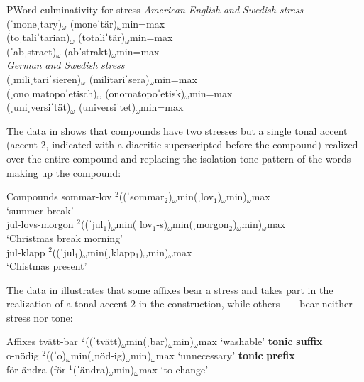 \documentclass[output=paper]{langscibook}
\begin{document}
\ea  PWord culminativity for stress \label{ex:downing:13}
\ea  \textit{American} \textit{English} \textit{and} \textit{Swedish} \textit{stress}\\
\ex  (ˈmoneˌtary)$_ω$  (moneˈtär)$_ω$min=max\\
\ex  (toˌtaliˈtarian)$_ω$  (totaliˈtär)$_ω$min=max\\
\ex  (ˈabˌstract)$_ω$  (abˈstrakt)$_ω$min=max\\
\ex  \textit{German} \textit{and} \textit{Swedish} \textit{stress}\\
\ex  (ˌmiliˌtariˈsieren)$_ω$  (militariˈsera)$_ω$min=max\\
\ex  (ˌonoˌmatopoˈetisch)$_ω$  (onomatopoˈetisk)$_ω$min=max\\
\ex  (ˌuniˌversiˈtät)$_ω$  (universiˈtet)$_ω$min=max\\
\z
\z

The data in  shows that compounds have two stresses but a single tonal accent (accent 2, indicated with a diacritic superscripted before the compound) realized over the entire compound and replacing the isolation tone pattern of the words making up the compound:


\ea  Compounds \label{ex:downing:14}
\ea  sommar-lov   $^2$((ˈsommar$_2$)$_ω$min(ˌlov$_1$)$_ω$min)$_ω$max \\
     ‘summer break’\\
\ex   jul-lovs-morgon  $^2$((ˈjul$_1$)$_ω$min(ˌlov$_1${}-s)$_ω$min(ˌmorgon$_2$)$_ω$min)$_ω$max \\
    ‘Christmas break morning’\\
\ex   jul-klapp   $^2$((ˈjul$_1$)$_ω$min(ˌklapp$_1$)$_ω$min)$_ω$max \\
     ‘Chistmas present’\\
\z
\z

The data in  illustrates that some affixes bear a stress and takes part in the realization of a tonal accent 2 in the construction, while others –   – bear neither stress nor tone:


\ea  Affixes \label{ex:downing:15}
\ea  tvätt-bar  $^2$((ˈtvätt)$_ω$min(ˌbar)$_ω$min)$_ω$max   ‘washable’ \textbf{tonic} \textbf{suffix} \label{ex:downing:15a}\\
\ex   o-nödig  $^2$((ˈo)$_ω$min(ˌnöd-ig)$_ω$min)$_ω$max   ‘unnecessary’ \textbf{tonic} \textbf{prefix}\label{ex:downing:15b}\\
\ex   för-ändra  (för-$^1$(ˈändra)$_ω$min)$_ω$max   ‘to change’\label{ex:downing:15c}\\
\z
\z
\end{document}
